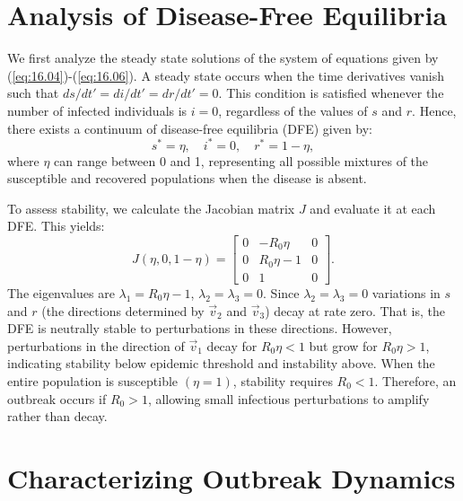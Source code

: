 \section{Analysis of Disease-Free Equilibria}

We first analyze the steady state solutions of the system of equations given by (\ref{eq:16.04})-(\ref{eq:16.06}). A steady state occurs when the time derivatives vanish such that $ds/dt'=di/dt'=dr/dt'=0$. This condition is satisfied whenever the number of infected individuals is $i=0$, regardless of the values of $s$ and $r$. Hence, there exists a continuum of disease-free equilibria (DFE) given by:
\begin{equation*}
s^* = \eta, \quad i^* = 0, \quad r^* = 1-\eta,
\end{equation*}
where $\eta$ can range between 0 and 1, representing all possible mixtures of the susceptible and recovered populations when the disease is absent.

To assess stability, we calculate the Jacobian matrix $J$ and evaluate it at each DFE. This yields:
\begin{equation}
J(\eta,0,1-\eta) = \begin{bmatrix}
0 & -R_0\eta & 0\\
0 & R_0\eta-1 & 0\\
0 & 1 & 0
\end{bmatrix}. \label{eq:16.07}
\end{equation}
The eigenvalues are $\lambda_1=R_0\eta-1$, $\lambda_2=\lambda_3=0$. Since $\lambda_2=\lambda_3=0$ variations in $s$ and $r$ (the directions determined by $\vec{v}_2$ and $\vec{v}_3$) decay at rate zero. That is, the DFE is neutrally stable to perturbations in these directions. However, perturbations in the direction of $\vec{v}_1$ decay for $R_0\eta<1$ but grow for $R_0\eta>1$, indicating stability below epidemic threshold and instability above. When the entire population is susceptible $(\eta=1)$, stability requires $R_0<1$. Therefore, an outbreak occurs if $R_0>1$, allowing small infectious perturbations to amplify rather than decay.

\section{Characterizing Outbreak Dynamics}

